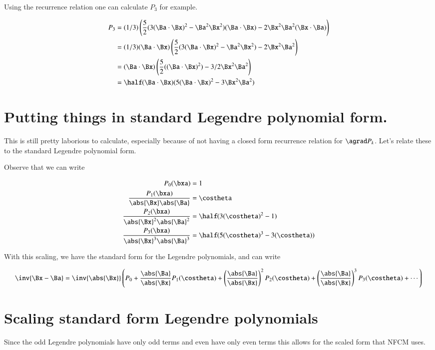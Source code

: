 Using the recurrence relation one can calculate $P_3$ for example.

\begin{align*}
P_3
&=
(1/3)\left(
\frac{5}{2}(3(\Ba \cdot \Bx)^2 -\Ba^2\Bx^2)({\Ba \cdot \Bx})
- 2 \Bx^2 \Ba^2(\Bx \cdot \Ba) \right) \\
&=
(1/3) ({\Ba \cdot \Bx}) \left(
\frac{5}{2}(3(\Ba \cdot \Bx)^2 -\Ba^2\Bx^2)
- 2 \Bx^2 \Ba^2 \right) \\
&=
({\Ba \cdot \Bx}) \left( \frac{5}{2}((\Ba \cdot \Bx)^2 ) - 3/2 \Bx^2 \Ba^2 \right) \\
&=
\half({\Ba \cdot \Bx}) ( {5}(\Ba \cdot \Bx)^2 - 3 \Bx^2 \Ba^2 ) \\
\end{align*}

\section{ Putting things in standard Legendre polynomial form.}

This is still pretty laborious to calculate, especially because of not having a closed form recurrence
relation for $\agrad P_k$.  Let's relate these to the standard Legendre polynomial form.

Observe that we can write

\begin{align*}
P_0(\bxa) &= 1 \\
\frac{P_1(\bxa)}{\abs{\Bx} \abs{\Ba}} &= \costheta \\
\frac{P_2(\bxa)}{\abs{\Bx}^2 \abs{\Ba}^2} &= \half(3(\costheta)^2 - 1) \\
\frac{P_3(\bxa)}{\abs{\Bx}^3 \abs{\Ba}^3} &= \half ( {5}(\costheta)^3 - 3 {(\costheta)} ) \\
\end{align*}

With this scaling, we have the standard form for the Legendre polynomials, and can write

\[
\inv{\Bx-\Ba} = \inv{\abs{\Bx}}\left(
P_0 
+ \frac{\abs{\Ba}}{\abs{\Bx}} P_1(\costheta)
+ \left(\frac{\abs{\Ba}}{\abs{\Bx}}\right)^2 P_2(\costheta)
+ \left(\frac{\abs{\Ba}}{\abs{\Bx}}\right)^3 P_3(\costheta)
+ \cdots \right)
\]

\section{ Scaling standard form Legendre polynomials }

Since the odd Legendre polynomials have only odd terms and even have only even terms this allows for
the scaled form that NFCM uses.

